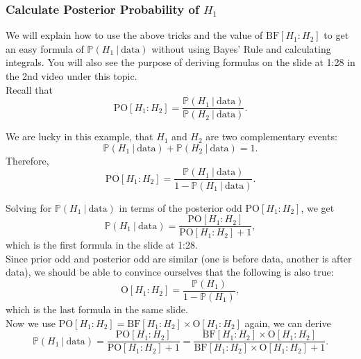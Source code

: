 \documentclass{article}
\def\dsst{\displaystyle}
\begin{document}
\subsubsection*{Calculate Posterior Probability of $H_1$}

We will explain how to use the above tricks and the value of $\text{BF}[H_1:H_2]$ to get an easy formula of $\mathbb{P}(H_1~|~\text{data})$ without using Bayes' Rule and calculating integrals. You will also see the purpose of deriving formulas on the slide at 1:28 in the 2nd video under this topic.\\

Recall that
$$ \text{PO}[H_1:H_2] = \frac{\mathbb{P}(H_1~|~\text{data})}{\mathbb{P}(H_2~|~\text{data})}. $$

We are lucky in this example, that $H_1$ and $H_2$ are two complementary events:
$$ \mathbb{P}(H_1~|~\text{data}) + \mathbb{P}(H_2~|~\text{data}) = 1. $$
Therefore,
$$ \text{PO}[H_1:H_2] = \frac{\mathbb{P}(H_1~|~\text{data})}{1-\mathbb{P}(H_1~|~\text{data})}. $$

Solving for $\mathbb{P}(H_1~|~\text{data})$ in terms of the posterior odd $\text{PO}[H_1:H_2]$, we get
$$ \mathbb{P}(H_1~|~\text{data}) = \frac{\text{PO}[H_1:H_2]}{\text{PO}[H_1:H_2] + 1}, $$
which is the first formula in the slide at 1:28.\\

Since prior odd and posterior odd are similar (one is before data, another is after data), we should be able to convince ourselves that the following is also true:
$$ \text{O}[H_1:H_2] = \frac{\mathbb{P}(H_1)}{1-\mathbb{P}(H_1)}, $$
which is the last formula in the same slide.\\


Now we use $\text{PO}[H_1:H_2] = \text{BF}[H_1:H_2]\times\text{O}[H_1:H_2]$ again, we can derive
$$\mathbb{P}(H_1~|~\text{data}) =  \frac{\text{PO}[H_1:H_2]}{\text{PO}[H_1:H_2]+1} = \frac{\text{BF}[H_1:H_2]\times \text{O}[H_1:H_2]}{\text{BF}[H_1:H_2]\times \text{O}[H_1:H_2] + 1}. $$
\end{document}
